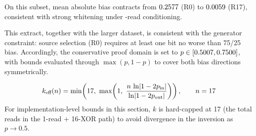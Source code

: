 \documentclass[titlepage]{report}
\begin{document}
	On this subset, mean absolute bias contracts from $0.2577$ (R0) to $0.0059$ (R17), consistent with strong whitening under \CalibXorReads-read conditioning.

	This extract, together with the larger dataset, is consistent with the generator constraint: source selection (R0) requires at least one bit no worse than 75/25 bias. Accordingly, the conservative proof domain is set to $p\in[0.5007,0.7500]$, with bounds evaluated through $\max(p,1-p)$ to cover both bias directions symmetrically.
	
	\[
	k_{\text{eff}}(n)=\min\!\left(\CalibXorReads,\ \max\!\left(1,\ \frac{n\,\ln\!\left|1-2p_{\text{in}}\right|}{\ln\!\left|1-2p_{\text{out}}\right|}\right)\right),\qquad n=\CalibXorReads
	\]
		For implementation-level bounds in this section, $k$ is hard-capped at 17 (the total reads in the 1-read + 16-XOR path) to avoid divergence in the inversion as $p\to0.5$.
	
\end{document}
